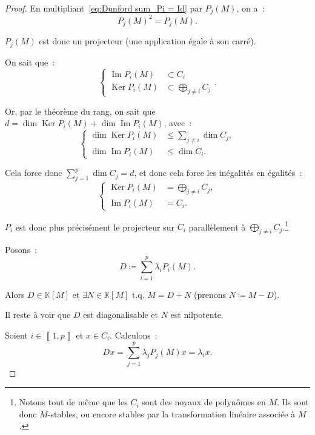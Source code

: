 \documentclass{report}
\theoremstyle{definition}
\theoremstyle{remark}
\numberwithin{equation}{section}
\newcommand{\K}{\mathbb K}
\newcommand{\tq}{\text{ t.q. }}
\DeclareMathOperator{\Ker}{Ker}
\DeclareMathOperator{\Imf}{Im}
\newcommand{\intint}[2]{\left\llbracket#1, #2\right\rrbracket}
\begin{document}
\begin{proof}
			En multipliant~\eqref{eq:Dunford sum_Pi = Id} par $P_j(M)$, on a~:
			\begin{equation}
				P_j(M)^2 = P_j(M).
			\end{equation}

			$P_j(M)$ est donc un projecteur (une application égale à son carré).

			On sait que~:
			\begin{equation}
				\begin{cases}
				\Imf P_i(M) &\subset C_i \\\Ker P_i(M) &\subset \displaystyle \bigoplus_{j \neq i}C_j
			\end{cases}.
			\end{equation}

			Or, par le théorème du rang, on sait que $d = \dim \Ker P_i(M) + \dim \Imf P_i(M)$, avec~:
			\begin{equation}
				\begin{cases}
				\dim \Ker P_i(M) &\leq \sum_{j \neq i} \dim C_j, \\
				\dim \Imf P_i(M) &\leq \dim C_i.
			\end{cases}
			\end{equation}

			Cela force donc $\sum_{j=1}^p\dim C_j = d$, et donc cela force les inégalités en égalités~:
			\begin{equation}
				\begin{cases}
				\Ker P_i(M) &= \displaystyle \bigoplus_{j \neq i}C_j, \\
				\Imf P_i(M) &= C_i.
			\end{cases}
			\end{equation}

			$P_i$ est donc plus précisément le projecteur sur $C_i$ parallèlement à $\bigoplus_{j \neq i}C_j$.\footnote{Notons tout de même que les $C_i$ sont des
			noyaux de polynômes en $M$. Ils sont donc $M$-stables, ou encore stables par la transformation linéaire associée à $M$.}

			Posons~:
			\begin{equation}
				D \coloneqq \sum_{i=1}^p\lambda_iP_i(M).
			\end{equation}

			Alors $D \in \K[M]$ et $\exists N \in \K[M] \tq M = D+N$ (prenons $N \coloneqq M-D$).

			Il reste à voir que $D$ est diagonalisable et $N$ est nilpotente.

			Soient $i \in \intint 1p$ et $x \in C_i$. Calculons~:
			\begin{equation}
				Dx = \sum_{j=1}^p\lambda_jP_j(M)x = \lambda_ix.
			\end{equation}


\end{proof}
\end{document}
